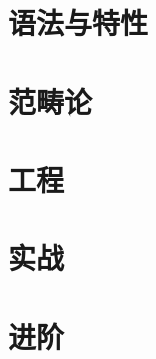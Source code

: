 \part{语法与特性}









\part{范畴论}













\part{工程}







\part{实战}









\part{进阶}








